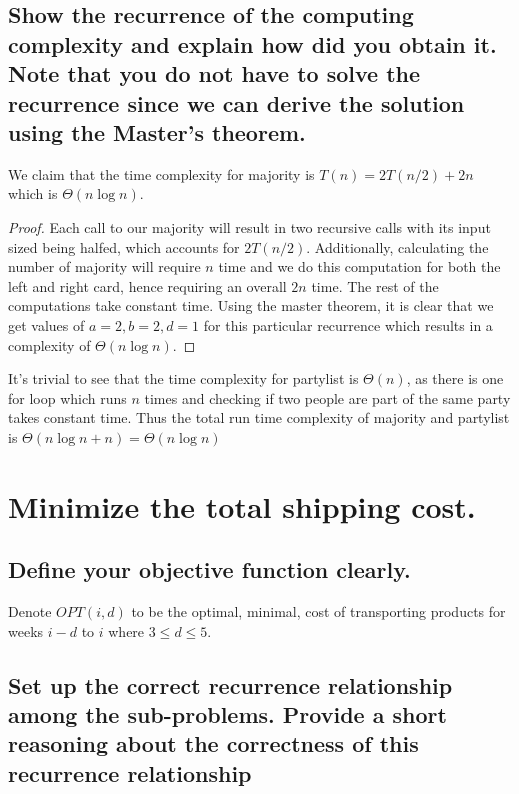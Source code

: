 \documentclass[11pt]{scrartcl}
\begin{document}
\subsection{
	Show the recurrence of the computing complexity and explain how did you obtain it.
	Note that you do not have to solve the recurrence since we can derive the solution
	using the Master’s theorem.
}
We claim that the time complexity for majority is $T(n) = 2T(n/2) + 2n$ which is $\Theta(n\log n)$.
\begin{proof}
	Each call to our majority will result in two recursive calls
	with its input sized being halfed, which accounts for $2T(n/2)$. Additionally, calculating
	the number of majority will require $n$ time and we do this computation for both the left
	and right card, hence requiring an overall $2n$ time. The rest of the computations take constant time.
	Using the master theorem, it is clear that we get values of $a = 2, b = 2, d = 1$ for this particular
	recurrence which results in a complexity of $\Theta(n\log n)$.
\end{proof}
It's trivial to see that the time complexity for partylist is $\Theta(n)$, as there is one for loop
which runs $n$ times and checking if two people are part of the same party takes constant time.
Thus the total run time complexity of majority and partylist is $\Theta(n\log n + n) = \Theta(n\log n)$









\section{Minimize the total shipping cost.}

\subsection{
	Define your objective function clearly.
}
Denote $OPT(i,d)$ to be the optimal, minimal, cost of
transporting products for weeks $i-d$ to $i$ where $3 \leq d \leq 5$.


\subsection{
	Set up the correct recurrence relationship among the sub-problems. Provide a short
	reasoning about the correctness of this recurrence relationship
}
\end{document}
